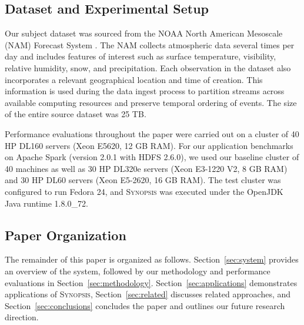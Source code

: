 \subsection{Dataset and Experimental Setup}
Our subject dataset was sourced from the NOAA North American Mesoscale (NAM) Forecast System \cite{noaa_nam}.  The NAM collects atmospheric data several times per day and includes features of interest such as surface temperature, visibility, relative humidity, snow, and precipitation. Each observation in the dataset also incorporates a relevant geographical location and time of creation. This information is used during the data ingest process to partition streams across available computing resources and preserve temporal ordering of events. The size of the entire source dataset was 25 TB.

Performance evaluations throughout the paper were carried out on a cluster of 40 HP DL160 servers (Xeon E5620, 12 GB RAM). For our application benchmarks on Apache Spark (version 2.0.1 with HDFS 2.6.0), we used our baseline cluster of 40 machines as well as 30 HP DL320e servers (Xeon E3-1220 V2, 8 GB RAM) and 30 HP DL60 servers (Xeon E5-2620, 16 GB RAM). The test cluster was configured to run Fedora 24, and \textsc{Synopsis} was executed under the OpenJDK Java runtime 1.8.0\_72.

\subsection{Paper Organization}
The remainder of this paper is organized as follows. Section~\ref{sec:system} provides an overview of the system, followed by our methodology and performance evaluations in Section~\ref{sec:methodology}. Section~\ref{sec:applications} demonstrates applications of \textsc{Synopsis}, Section~\ref{sec:related} discusses related approaches, and Section~\ref{sec:conclusions} concludes the paper and outlines our future research direction.
